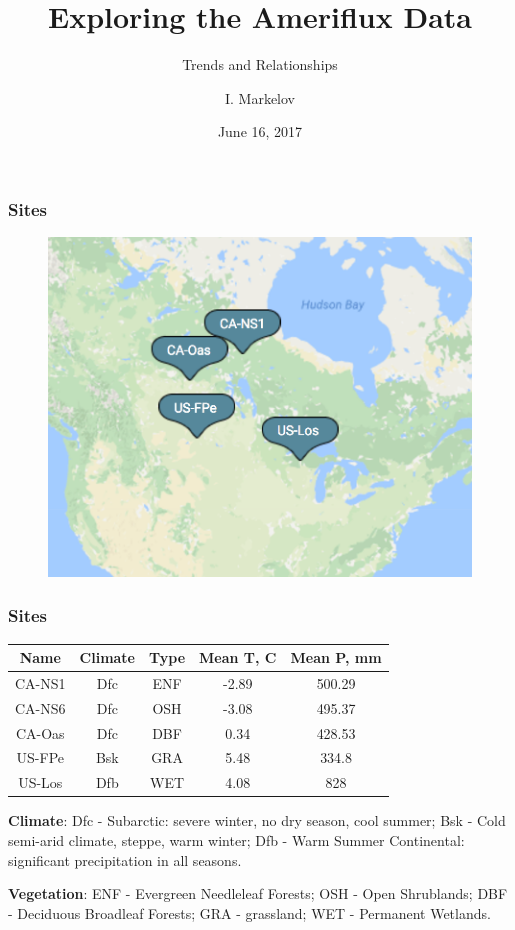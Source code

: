 \documentclass{beamer}
\title{Exploring the Ameriflux Data}
\subtitle{Trends and Relationships}
\author{I. Markelov}
\institute{Upscaling Workgroup Meeting}
\date{June 16, 2017}
\begin{document}
\begin{frame}
\titlepage
\end{frame}


\begin{frame}
\frametitle{Sites}
\begin{figure}
\includegraphics[width=\textwidth]{sites.png}
\end{figure}
\end{frame}


\begin{frame}
\frametitle{Sites}

\begin{center}
\begin{tabular}{| c | c | c | c | c |}
\hline
Name & Climate & Type & Mean T, C & Mean P, mm \\ \hline
CA-NS1 & Dfc & ENF & -2.89 & 500.29 \\\hline
CA-NS6 & Dfc & OSH & -3.08 & 495.37 \\\hline
CA-Oas & Dfc & DBF & 0.34 & 428.53 \\\hline
US-FPe & Bsk & GRA & 5.48 & 334.8 \\\hline
US-Los &  Dfb& WET &   4.08 & 828\\\hline

\hline
\end{tabular}
\end{center}


\textbf{Climate}:
Dfc - Subarctic: severe winter, no dry season, cool summer;
Bsk - Cold semi-arid climate, steppe, warm winter;
Dfb - Warm Summer Continental: significant precipitation in all seasons.

\textbf{Vegetation}:
ENF - Evergreen Needleleaf Forests;
OSH - Open Shrublands;
DBF - Deciduous Broadleaf Forests;
GRA - grassland;
WET - Permanent Wetlands.


\end{frame}
\end{document}
